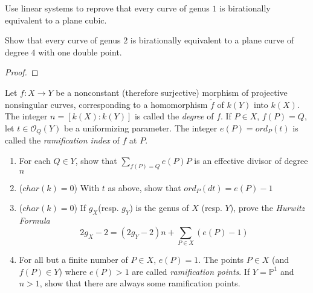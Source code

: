 \documentclass{solution}
\begin{document}
\begin{problem}{8.35}
    \begin{inparaenum}
        \item Use linear systems to reprove that every curve of genus $1$ is birationally equivalent to a plane cubic.
        \item Show that every curve of genus $2$ is birationally equivalent to a plane curve of degree $4$ with one double point.
    \end{inparaenum}
\end{problem}

\begin{proof}
    \TODO
\end{proof}

\begin{problem}{8.36}
    Let $f: X \rightarrow Y$ be a nonconstant (therefore surjective) morphism of projective nonsingular curves, corresponding to a homomorphism $\tilde{f}$ of $k(Y)$ into $k(X)$. The integer $n = [k(X): k(Y)]$ is called the \textit{degree} of $f$. If $P \in X$, $f(P) = Q$, let $t \in \mathcal{O}_{Q}(Y)$ be a uniformizing parameter. The integer $e(P) = ord_P(t)$ is called the \textit{ramification index} of $f$ at $P$.
    \begin{enumerate}
        \item For each $Q \in Y$, show that $\sum_{f(P) = Q} e(P) P$ is an effective divisor of degree $n$
        \item ($char(k) = 0$) With $t$ as above, show that $ord_P(dt) = e(P) - 1$
        \item ($char(k) = 0$) If $g_X$(resp. $g_Y$) is the genus of $X$ (resp. $Y$), prove the \textit{Hurwitz Formula}
        $$2g_X - 2 = (2g_Y - 2)n + \sum\limits_{P \in X} (e(P) - 1)$$
        \item For all but a finite number of $P \in X$, $e(P) = 1$. The points $P \in X$ (and $f(P) \in Y$) where $e(P) \gt 1$ are called \textit{ramification points}. If $Y = \mathbb{P}^1$ and $n \gt 1$, show that there are always some ramification points.
    \end{enumerate}
\end{problem}
\end{document}
